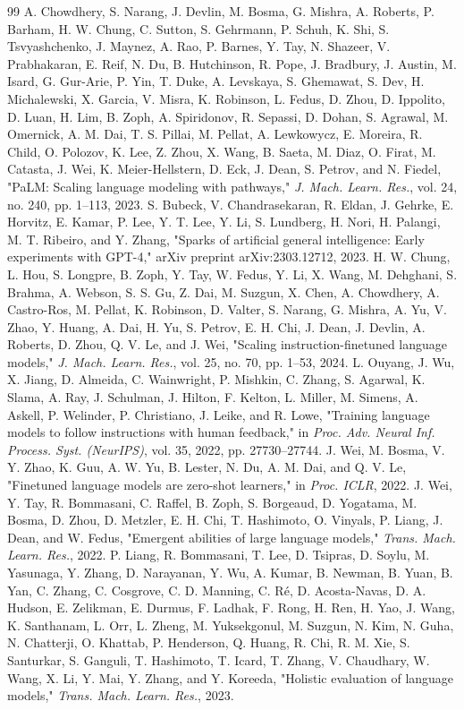 \documentclass[journal]{IEEEtran}
\begin{document}
\begin{thebibliography}{99}
A. Chowdhery, S. Narang, J. Devlin, M. Bosma, G. Mishra, A. Roberts, P. Barham, H. W. Chung, C. Sutton, S. Gehrmann, P. Schuh, K. Shi, S. Tsvyashchenko, J. Maynez, A. Rao, P. Barnes, Y. Tay, N. Shazeer, V. Prabhakaran, E. Reif, N. Du, B. Hutchinson, R. Pope, J. Bradbury, J. Austin, M. Isard, G. Gur-Arie, P. Yin, T. Duke, A. Levskaya, S. Ghemawat, S. Dev, H. Michalewski, X. Garcia, V. Misra, K. Robinson, L. Fedus, D. Zhou, D. Ippolito, D. Luan, H. Lim, B. Zoph, A. Spiridonov, R. Sepassi, D. Dohan, S. Agrawal, M. Omernick, A. M. Dai, T. S. Pillai, M. Pellat, A. Lewkowycz, E. Moreira, R. Child, O. Polozov, K. Lee, Z. Zhou, X. Wang, B. Saeta, M. Diaz, O. Firat, M. Catasta, J. Wei, K. Meier-Hellstern, D. Eck, J. Dean, S. Petrov, and N. Fiedel, "PaLM: Scaling language modeling with pathways," \textit{J. Mach. Learn. Res.}, vol. 24, no. 240, pp. 1–113, 2023.
S. Bubeck, V. Chandrasekaran, R. Eldan, J. Gehrke, E. Horvitz, E. Kamar, P. Lee, Y. T. Lee, Y. Li, S. Lundberg, H. Nori, H. Palangi, M. T. Ribeiro, and Y. Zhang, "Sparks of artificial general intelligence: Early experiments with GPT-4," arXiv preprint arXiv:2303.12712, 2023.
H. W. Chung, L. Hou, S. Longpre, B. Zoph, Y. Tay, W. Fedus, Y. Li, X. Wang, M. Dehghani, S. Brahma, A. Webson, S. S. Gu, Z. Dai, M. Suzgun, X. Chen, A. Chowdhery, A. Castro-Ros, M. Pellat, K. Robinson, D. Valter, S. Narang, G. Mishra, A. Yu, V. Zhao, Y. Huang, A. Dai, H. Yu, S. Petrov, E. H. Chi, J. Dean, J. Devlin, A. Roberts, D. Zhou, Q. V. Le, and J. Wei, "Scaling instruction-finetuned language models," \textit{J. Mach. Learn. Res.}, vol. 25, no. 70, pp. 1–53, 2024.
L. Ouyang, J. Wu, X. Jiang, D. Almeida, C. Wainwright, P. Mishkin, C. Zhang, S. Agarwal, K. Slama, A. Ray, J. Schulman, J. Hilton, F. Kelton, L. Miller, M. Simens, A. Askell, P. Welinder, P. Christiano, J. Leike, and R. Lowe, "Training language models to follow instructions with human feedback," in \textit{Proc. Adv. Neural Inf. Process. Syst. (NeurIPS)}, vol. 35, 2022, pp. 27730–27744.
J. Wei, M. Bosma, V. Y. Zhao, K. Guu, A. W. Yu, B. Lester, N. Du, A. M. Dai, and Q. V. Le, "Finetuned language models are zero-shot learners," in \textit{Proc. ICLR}, 2022.
J. Wei, Y. Tay, R. Bommasani, C. Raffel, B. Zoph, S. Borgeaud, D. Yogatama, M. Bosma, D. Zhou, D. Metzler, E. H. Chi, T. Hashimoto, O. Vinyals, P. Liang, J. Dean, and W. Fedus, "Emergent abilities of large language models," \textit{Trans. Mach. Learn. Res.}, 2022.
P. Liang, R. Bommasani, T. Lee, D. Tsipras, D. Soylu, M. Yasunaga, Y. Zhang, D. Narayanan, Y. Wu, A. Kumar, B. Newman, B. Yuan, B. Yan, C. Zhang, C. Cosgrove, C. D. Manning, C. Ré, D. Acosta-Navas, D. A. Hudson, E. Zelikman, E. Durmus, F. Ladhak, F. Rong, H. Ren, H. Yao, J. Wang, K. Santhanam, L. Orr, L. Zheng, M. Yuksekgonul, M. Suzgun, N. Kim, N. Guha, N. Chatterji, O. Khattab, P. Henderson, Q. Huang, R. Chi, R. M. Xie, S. Santurkar, S. Ganguli, T. Hashimoto, T. Icard, T. Zhang, V. Chaudhary, W. Wang, X. Li, Y. Mai, Y. Zhang, and Y. Koreeda, "Holistic evaluation of language models," \textit{Trans. Mach. Learn. Res.}, 2023.

\end{thebibliography}
\end{document}

